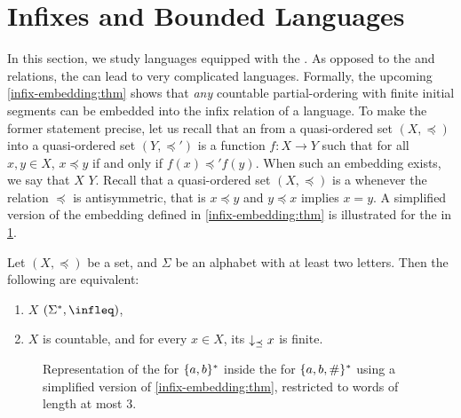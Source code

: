 \section{Infixes and Bounded Languages}
\label{infixes-regular:sec}

\AP In this section, we study languages equipped with the .
As opposed to the  and  relations, the  can lead to very complicated  languages.
Formally, the upcoming \cref{infix-embedding:thm} shows that
\emph{any} countable partial-ordering with finite initial segments can be
embedded into the infix relation of a language. To make the former statement
precise, let us recall that an  from a quasi-ordered set
$(X, \preceq)$ into a quasi-ordered set $(Y, \preceq')$ is a function $f \colon
X \to Y$ such that for all $x, y \in X$, $x \preceq y$ if and only if $f(x)
\preceq' f(y)$. When such an embedding exists, we say that $X$  $Y$. Recall that a quasi-ordered set $(X, \preceq)$ is a  whenever the relation $\preceq$ is antisymmetric, that is $x \preceq
y$ and $y \preceq x$ implies $x = y$. 
A simplified version of the embedding defined in \cref{infix-embedding:thm} is illustrated
for the  in \cref{infix-embedding:fig}.
\begin{lemma}{\cite[Lemma 5.1]{DBLP:journals/ita/Kuske06}}
    \label{infix-embedding:thm}
    Let $(X, \preceq)$ be a  set,
    and $\Sigma$ be an alphabet with at least two letters.
    Then the following are equivalent:
    \begin{enumerate}
        \item 
            $X$  $(\Sigma^*, \infleq)$,
        \item 
            $X$ is countable, and for every $x \in X$,
            its 
            $\dwset[\preceq]{x}$ is finite.
    \end{enumerate}
\end{lemma}
\begin{figure}
    \centering
    
    \caption{Representation of the  for $\{ a,b \}^*$
        inside the  for $\{ a,b,\# \}^*$
        using a simplified version of \cref{infix-embedding:thm}, restricted to words
        of length at most $3$. 
    }
    \label{infix-embedding:fig}
\end{figure}

